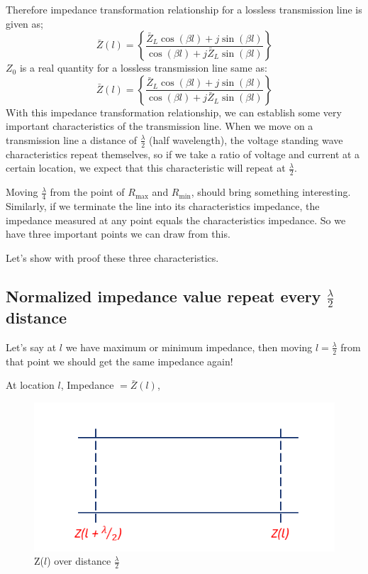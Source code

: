 Therefore impedance transformation relationship for a lossless transmission line is given as;
\begin{equation}
\bar{Z}(l) = \left\lbrace \frac{\bar{Z}_L\cos(\beta l) + j\sin(\beta l)}{\cos(\beta l) + j\bar{Z}_L\sin(\beta l)}\right\rbrace
\label{eqn:implossless}
\end{equation}
$Z_0$ is a real quantity for a lossless transmission line same as:
\begin{equation}
\bar{Z}(l) = \left\lbrace \frac{\bar{Z}_L\cos(\beta l) + j\sin(\beta l)}{\cos(\beta l) + j\bar{Z}_L\sin(\beta l)}\right\rbrace
\label{eqn:implosslessnorm}
\end{equation}
With this impedance transformation relationship, we can establish some very important characteristics of the transmission line. When we move on a transmission line a distance of $\frac{\lambda}{2}$ (half wavelength), the voltage standing wave characteristics repeat themselves, so if we take a ratio of voltage and current at a certain location, we expect that this characteristic will repeat at $\frac{\lambda}{2}$.

Moving $\frac{\lambda}{4}$ from the point of $R_{\max}$ and $R_{\min}$, should bring something interesting. Similarly, if we terminate the line into its characteristics impedance, the impedance measured at any point equals the characteristics impedance. So we have three important points we can draw from this.

Let's show with proof these three characteristics.

\subsection{Normalized impedance value repeat every $\frac{\lambda}{2}$ distance}
Let's say at $l$ we have maximum or minimum impedance, then moving $l=\frac{\lambda}{2}$ from that point we should get the same impedance again!

At location $l$, Impedance $= \bar{Z}(l)$,
\begin{figure}[h]
\centering
\includegraphics[width=1.1\linewidth]{./graphics/load_over_half_wavelength}
\caption{Z($l$) over distance $\frac{\lambda}{2}$}
\label{fig:astyuif}
\end{figure}

